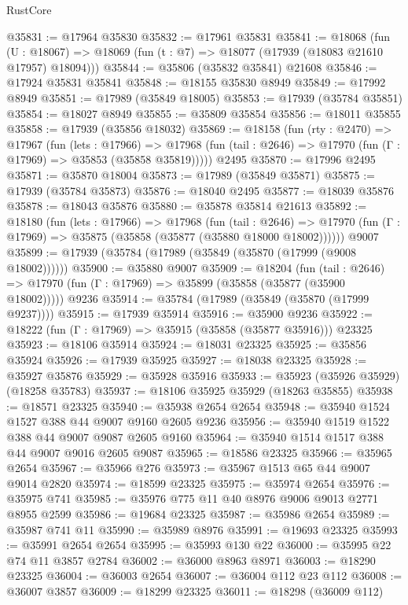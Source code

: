 \begin{lexlean}{RustCore}
\begin{coremodule}
@35831 := @17964 @35830
@35832 := @17961 @35831
@35841 := @18068
    (fun (U : @18067) => @18069 (fun (t : @7) => @18077 (@17939 (@18083 @21610 @17957) @18094)))
@35844 := @35806 (@35832 @35841) @21608
@35846 := @17924 @35831 @35841
@35848 := @18155 @35830 @8949
@35849 := @17992 @8949
@35851 := @17989 (@35849 @18005)
@35853 := @17939 (@35784 @35851)
@35854 := @18027 @8949
@35855 := @35809 @35854
@35856 := @18011 @35855
@35858 := @17939 (@35856 @18032)
@35869 := @18158
    (fun (rty : @2470) =>
    @17967
      (fun (lets : @17966) =>
      @17968 (fun (tail : @2646) => @17970 (fun (Γ : @17969) => @35853 (@35858 @35819)))))
    @2495
@35870 := @17996 @2495
@35871 := @35870 @18004
@35873 := @17989 (@35849 @35871)
@35875 := @17939 (@35784 @35873)
@35876 := @18040 @2495
@35877 := @18039 @35876
@35878 := @18043 @35876
@35880 := @35878 @35814 @21613
@35892 := @18180
    (fun (lets : @17966) =>
    @17968
      (fun (tail : @2646) =>
      @17970 (fun (Γ : @17969) => @35875 (@35858 (@35877 (@35880 @18000 @18002))))))
    @9007
@35899 := @17939 (@35784 (@17989 (@35849 (@35870 (@17999 (@9008 @18002))))))
@35900 := @35880 @9007
@35909 := @18204
    (fun (tail : @2646) => @17970 (fun (Γ : @17969) => @35899 (@35858 (@35877 (@35900 @18002)))))
    @9236
@35914 := @35784 (@17989 (@35849 (@35870 (@17999 @9237))))
@35915 := @17939 @35914
@35916 := @35900 @9236
@35922 := @18222 (fun (Γ : @17969) => @35915 (@35858 (@35877 @35916))) @23325
@35923 := @18106 @35914
@35924 := @18031 @23325
@35925 := @35856 @35924
@35926 := @17939 @35925
@35927 := @18038 @23325
@35928 := @35927 @35876
@35929 := @35928 @35916
@35933 := @35923 (@35926 @35929) (@18258 @35783)
@35937 := @18106 @35925 @35929 (@18263 @35855)
@35938 := @18571 @23325
@35940 := @35938 @2654 @2654
@35948 := @35940 @1524 @1527 @388 @44 @9007 @9160 @2605 @9236
@35956 := @35940 @1519 @1522 @388 @44 @9007 @9087 @2605 @9160
@35964 := @35940 @1514 @1517 @388 @44 @9007 @9016 @2605 @9087
@35965 := @18586 @23325
@35966 := @35965 @2654
@35967 := @35966 @276
@35973 := @35967 @1513 @65 @44 @9007 @9014 @2820
@35974 := @18599 @23325
@35975 := @35974 @2654
@35976 := @35975 @741
@35985 := @35976 @775 @11 @40 @8976 @9006 @9013 @2771 @8955 @2599
@35986 := @19684 @23325
@35987 := @35986 @2654
@35989 := @35987 @741 @11
@35990 := @35989 @8976
@35991 := @19693 @23325
@35993 := @35991 @2654 @2654
@35995 := @35993 @130 @22
@36000 := @35995 @22 @74 @11 @3857 @2784
@36002 := @36000 @8963 @8971
@36003 := @18290 @23325
@36004 := @36003 @2654
@36007 := @36004 @112 @23 @112
@36008 := @36007 @3857
@36009 := @18299 @23325
@36011 := @18298 (@36009 @112)

\end{coremodule}
\end{lexlean}
